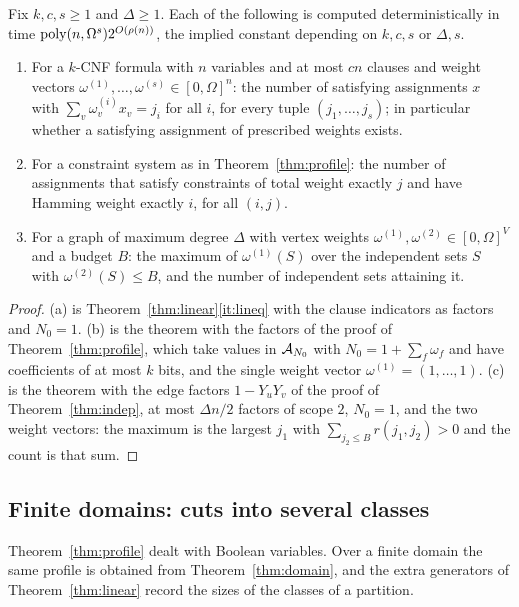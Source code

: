 \begin{corollary}\label{cor:linear}
Fix $k,c,s\ge1$ and $\Delta\ge1$. Each of the following is computed
deterministically in time $\operatorname{poly}(n,\Omega^s)2^{O(\rho(n))}$, the implied
constant depending on $k,c,s$ or $\Delta,s$.
\begin{enumerate}[label=\textup{(\alph*)},leftmargin=2.2em]
\item For a $k$-CNF formula with $n$ variables and at most $cn$ clauses and
weight vectors $\omega^{(1)},\dots,\omega^{(s)}\in[0,\Omega]^n$: the number of
satisfying assignments $x$ with $\sum_v\omega^{(i)}_vx_v=j_i$ for all $i$, for
every tuple $(j_1,\dots,j_s)$; in particular whether a satisfying assignment of
prescribed weights exists.
\item For a constraint system as in Theorem~\ref{thm:profile}: the number of
assignments that satisfy constraints of total weight exactly $j$ and have Hamming
weight exactly $i$, for all $(i,j)$.
\item For a graph of maximum degree $\Delta$ with vertex weights
$\omega^{(1)},\omega^{(2)}\in[0,\Omega]^V$ and a budget $B$: the maximum of
$\omega^{(1)}(S)$ over the independent sets $S$ with $\omega^{(2)}(S)\le B$, and
the number of independent sets attaining it.
\end{enumerate}
\end{corollary}

\begin{proof}
(a) is Theorem~\ref{thm:linear}\ref{it:lineq} with the clause indicators as
factors and $N_0=1$. (b) is the theorem with the factors of the proof of
Theorem~\ref{thm:profile}, which take values in $\mathcal{A}_{N_0}$ with
$N_0=1+\sum_f\omega_f$ and have coefficients of at most $k$ bits, and the single
weight vector $\omega^{(1)}=(1,\dots,1)$. (c) is the theorem with the edge
factors $1-Y_uY_v$ of the proof of Theorem~\ref{thm:indep}, at most $\Delta n/2$
factors of scope $2$, $N_0=1$, and the two weight vectors: the maximum is the
largest $j_1$ with $\sum_{j_2\le B}r(j_1,j_2)>0$ and the count is that sum.
\end{proof}

\subsection{Finite domains: cuts into several classes}\label{ssec:qcut}
Theorem~\ref{thm:profile} dealt with Boolean variables. Over a finite domain the
same profile is obtained from Theorem~\ref{thm:domain}, and the extra generators
of Theorem~\ref{thm:linear} record the sizes of the classes of a partition.


